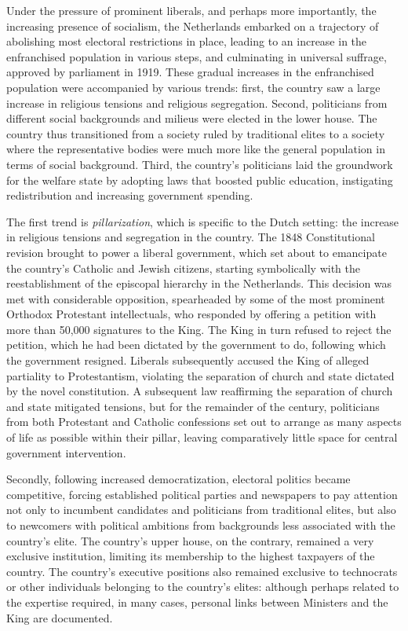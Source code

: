 Under the pressure of prominent liberals, and perhaps more importantly, the increasing presence of socialism, the Netherlands embarked on a trajectory of abolishing most electoral restrictions in place, leading to an increase in the enfranchised population in various steps, and culminating in universal suffrage, approved by parliament in 1919. These gradual increases in the enfranchised population were accompanied by various trends: first, the country saw a large increase in religious tensions and religious segregation. Second, politicians from different social backgrounds and milieus were elected in the lower house. The country thus transitioned from a society ruled by traditional elites to a society where the representative bodies were much more like the general population in terms of social background. \autocite{van1983toegang} Third, the country's politicians laid the groundwork for the welfare state by adopting laws that boosted public education, instigating redistribution and increasing government spending. 

The first trend is \textit{pillarization}, which is specific to the Dutch setting: the increase in religious tensions and segregation in the country. The 1848 Constitutional revision brought to power a liberal government, which set about to emancipate the country's Catholic and Jewish citizens, starting symbolically with the reestablishment of the episcopal hierarchy in the Netherlands. This decision was met with considerable opposition, spearheaded by some of the most prominent Orthodox Protestant intellectuals, who responded by offering a petition with more than 50,000 signatures to the King. The King in turn refused to reject the petition, which he had been dictated by the government to do, following which the government resigned. \autocite{oud1961honderd} Liberals subsequently accused the King of alleged partiality to Protestantism, violating the separation of church and state dictated by the novel constitution. A subsequent law reaffirming the separation of church and state mitigated tensions, but for the remainder of the century, politicians from both Protestant and Catholic confessions set out to arrange as many aspects of life as possible within their pillar, leaving comparatively little space for central government intervention. \autocite{van2013eerste}

Secondly, following increased democratization, electoral politics became competitive, forcing established political parties and newspapers to pay attention not only to incumbent candidates and politicians from traditional elites, but also to newcomers with political ambitions from backgrounds less associated with the country's elite. The country's upper house, on the contrary, remained a very exclusive institution, limiting its membership to the highest taxpayers of the country. The country's executive positions also remained exclusive to technocrats or other individuals belonging to the country's elites: although perhaps related to the expertise required, in many cases, personal links between Ministers and the King are documented. \autocite{secker1991ministers}

